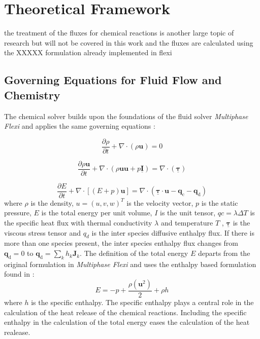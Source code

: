 \newpage
\chapter{Theoretical Framework}

the treatment of the fluxes for chemical reactions is another large topic of research \cite{lvDiscontinuousGalerkinMethod2014}
    but will not be covered in this work and the fluxes are calculated using the XXXXX formulation already implemented in flexi
\section{Governing Equations for Fluid Flow and Chemistry}
The chemical solver builds upon the foundations of the fluid solver \textit{Multiphase Flexi} and applies the 
same governing equations \cite{follUseTabulatedEquations2019}:

\begin{equation}
\frac{\partial \rho}{\partial t}+\nabla \cdot(\rho \boldsymbol{u})=0
\end{equation}

\begin{equation}
\frac{\partial \rho \boldsymbol{u}}{\partial t}+\nabla \cdot(\rho \boldsymbol{u} \boldsymbol{u}+p \underline{\boldsymbol{I}})=\nabla \cdot(\underline{\boldsymbol{\tau}})
\end{equation}

\begin{equation}
\frac{\partial E}{\partial t}+\nabla \cdot[(E+p) \boldsymbol{u}]=\nabla \cdot\left(\underline{\boldsymbol{\tau}} \cdot \boldsymbol{u}-\boldsymbol{q}_{\mathrm{c}}-\boldsymbol{q}_{\mathrm{d}}\right)
\end{equation}
where $\rho$ is the density, $u = (u, v, w)^T$ is the velocity vector, $p$ is the static pressure, $E$ is the total energy per unit volume, $I$ is the unit tensor, $qc = \lambda \Delta T$ is the specific heat flux with thermal conductivity $\lambda$ and temperature $T$ , $\underline{\boldsymbol{\tau}}$  is the viscous stress tensor and  $q_d$ is the inter species diffusive enthalpy flux. If there is more than one species present, the inter species enthalpy flux changes from $\boldsymbol{q}_{\mathrm{d}} = 0$  to $\boldsymbol{q}_{\mathrm{d}}=\sum_k h_k \boldsymbol{J}_k$.
The definition of the total energy $E$ departs from the original formulation in \textit{Multiphase Flexi} and uses the enthalpy based formulation found in \cite{fedkiwHighAccuracyNumerical1997}:
\begin{equation}
    E=-p+\frac{\rho\left(\boldsymbol{u}^2\right)}{2}+\rho h
\end{equation}
where $h$ is the specific enthalpy. The specific enthalpy plays a central role in the calculation of the heat release of the chemical reactions. Including the specific enthalpy in the calculation of the total energy eases the calculation of the heat realease. 


